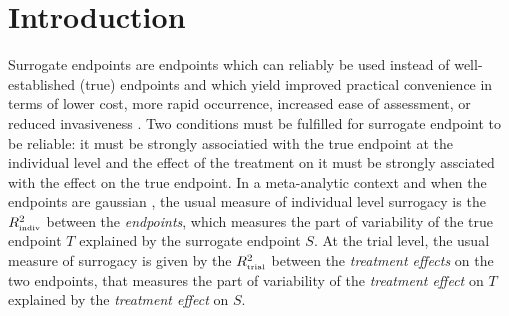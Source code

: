 \documentclass[]{scrartcl}\usepackage[]{graphicx}\usepackage[]{color}
\begin{document}
{%

\section{Introduction}

Surrogate endpoints are endpoints which can reliably be used
  instead of well-established (true) endpoints
  and which yield improved practical convenience
  in terms of lower cost,
  more rapid occurrence,
  increased ease of assessment, 
  or reduced invasiveness \citep{Burzykowski2006}.
Two conditions must be fulfilled for surrogate endpoint to be reliable:
  it must be strongly associatied with
  the true endpoint at the individual level and
  the effect of the treatment on it
  must be strongly assciated with the effect on the true endpoint.
In a meta-analytic context and when the endpoints are gaussian \citep{BuyseEtal00},
  the usual measure of individual level surrogacy is
  the $R^2_\text{\tiny indiv}$ between the \textit{endpoints},
  which measures the part of variability of the true endpoint $T$
  explained by the surrogate endpoint $S$.
At the trial level, the usual measure of surrogacy
  is given by the $R^2_\text{\tiny trial}$
  between the \textit{treatment effects} on the two endpoints,
  that measures the part of variability of the \textit{treatment effect} on $T$
  explained by the \textit{treatment effect} on $S$.

}
\end{document}
